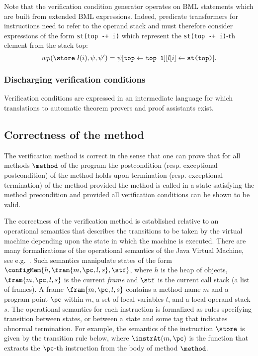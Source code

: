 Note that the verification condition generator operates on BML
statements which are built from extended BML expressions. Indeed,
predicate transformers for instructions need to refer to the operand
stack and must therefore consider expressions of the form
\verb!st(top -+ i)! which represent the \verb!st(top -+ i)!-th 
element from the stack top:
$$wp( \store \ l(i) , \psi , \psi') = \psi[\verb!top! \leftarrow \verb!top-1!][l[i] \leftarrow \verb!st(top)!].$$


\subsubsection{Discharging verification conditions}
Verification conditions are expressed in an intermediate language
for which translations to automatic theorem provers and proof
assistants exist.


\subsection{Correctness of the method}\label{subsec:sound}
The verification method is correct in the sense that one can prove
that for all methods $\method$ of the program the postcondition (resp.
exceptional postcondition) of the method holds upon termination (resp.
exceptional termination) of the method provided the method is called
in a state satisfying the method precondition and provided all
verification conditions can be shown to be valid.


The correctness of the verification method is established relative to
an operational semantics that describes the transitions to be taken by
the virtual machine depending upon the state in which the machine is
executed. There are many formalizations of the operational semantics
of the Java Virtual Machine, see
e.g.~\cite{BSS:jbook,FM03:jar,KN02:tcs,SH01pjo}. Such
semantics manipulate states of the form
$\configMem{h,\fram{m,\pc,l,s},\stf}$,
 where $h$ is the heap of objects,
$\fram{m,\pc,l,s}$ is the current \emph{frame} and $\stf$ is the
current call stack (a list of frames). A frame $\fram{m,\pc,l,s}$
contains a method name $m$ and a program point $\pc$ within $m$, a set
of local variables $l$, and a local operand stack~$s$.
The operational semantics for each instruction is formalized as rules specifying
 transition between states, or between a state and some tag that
indicates abnormal termination. For example, the semantics of
 the instruction $\store$ is given by the transition
rule below, where  $\instrAt (m,\pc)$ is the function that extracts
the $\pc$-th instruction from the body of method $\method$.

